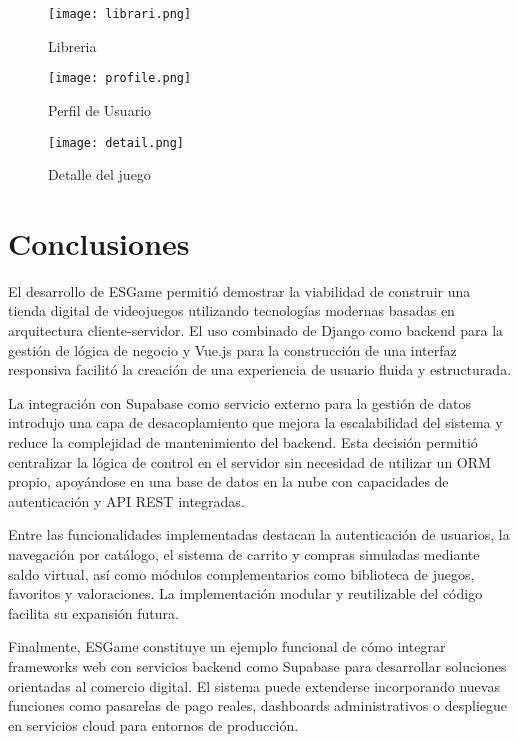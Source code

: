 \documentclass[conference]{IEEEtran}
\begin{document}
\begin{figure}[htbp]
	\centerline{\texttt{[image: librari.png]}}
	\caption{Libreria}
	\label{fig}
\end{figure}

\begin{figure}[htbp]
	\centerline{\texttt{[image: profile.png]}}
	\caption{Perfil de Usuario}
	\label{fig}
\end{figure}

\begin{figure}[htbp]
	\centerline{\texttt{[image: detail.png]}}
	\caption{Detalle del juego}
	\label{fig}
\end{figure}
\vspace{5\baselineskip}
\section{Conclusiones }
El desarrollo de ESGame permitió demostrar la viabilidad de construir una tienda digital de videojuegos utilizando tecnologías modernas basadas en arquitectura cliente-servidor. El uso combinado de Django como backend para la gestión de lógica de negocio y Vue.js para la construcción de una interfaz responsiva facilitó la creación de una experiencia de usuario fluida y estructurada.

La integración con Supabase como servicio externo para la gestión de datos introdujo una capa de desacoplamiento que mejora la escalabilidad del sistema y reduce la complejidad de mantenimiento del backend. Esta decisión permitió centralizar la lógica de control en el servidor sin necesidad de utilizar un ORM propio, apoyándose en una base de datos en la nube con capacidades de autenticación y API REST integradas.

Entre las funcionalidades implementadas destacan la autenticación de usuarios, la navegación por catálogo, el sistema de carrito y compras simuladas mediante saldo virtual, así como módulos complementarios como biblioteca de juegos, favoritos y valoraciones. La implementación modular y reutilizable del código facilita su expansión futura.

Finalmente, ESGame constituye un ejemplo funcional de cómo integrar frameworks web con servicios backend como Supabase para desarrollar soluciones orientadas al comercio digital. El sistema puede extenderse incorporando nuevas funciones como pasarelas de pago reales, dashboards administrativos o despliegue en servicios cloud para entornos de producción.
\end{document}
